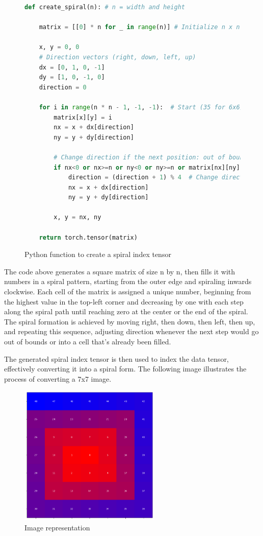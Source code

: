 \begin{figure}[H]
\centering
\begin{lstlisting}[language=Python]
def create_spiral(n): # n = width and height
    
    matrix = [[0] * n for _ in range(n)] # Initialize n x n matrix

    x, y = 0, 0
    # Direction vectors (right, down, left, up)
    dx = [0, 1, 0, -1]
    dy = [1, 0, -1, 0]
    direction = 0

    for i in range(n * n - 1, -1, -1):  # Start (35 for 6x6)
        matrix[x][y] = i
        nx = x + dx[direction]
        ny = y + dy[direction]

        # Change direction if the next position: out of bounds or filled
        if nx<0 or nx>=n or ny<0 or ny>=n or matrix[nx][ny]!=0:
            direction = (direction + 1) % 4  # Change direction
            nx = x + dx[direction]
            ny = y + dy[direction]

        x, y = nx, ny
    
    return torch.tensor(matrix)
\end{lstlisting}
\caption{Python function to create a spiral index tensor}
\label{fig:spiral_matrix}
\end{figure}

    The code above generates a square matrix of size n by n, then fills it with numbers in a spiral pattern, starting from the outer edge and spiraling inwards clockwise. Each cell of the matrix is assigned a unique number, beginning from the highest value in the top-left corner and decreasing by one with each step along the spiral path until reaching zero at the center or the end of the spiral. The spiral formation is achieved by moving right, then down, then left, then up, and repeating this sequence, adjusting direction whenever the next step would go out of bounds or into a cell that's already been filled.

    The generated spiral index tensor is then used to index the data tensor, effectively converting it into a spiral form. The following image illustrates the process of converting a 7x7 image.
    
    
    \begin{figure}[H]
    \centering
    \includegraphics[width=0.6\textwidth]{../code/dataAnalysis/plots/exampleImgs/spiralShowcase1.png}
    \caption{Image representation}
    \label{fig:spiral_indexing_1}        
    \end{figure}

